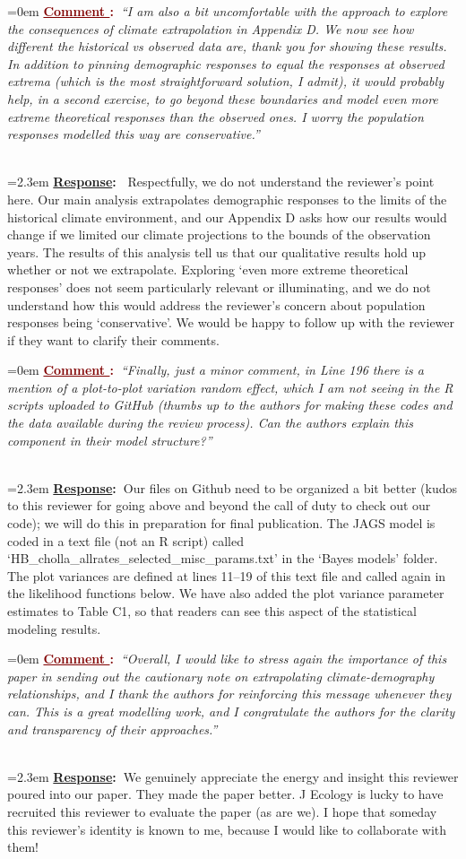 \documentclass[12pt]{article}
\newcounter{cN}
\newcommand{\comment}[1]{
	\vspace{2em}
	\refstepcounter{cN} %
	\noindent \hangindent=0em \textbf{\textcolor{Maroon}{\uline{Comment \thecN}:~}}\emph{``#1''}
	}
\newcommand{\response}[1]{
	\\[0.25em]
	\hangindent=2.3em \textbf{\textcolor{NavyBlue}{\uline{Response}:~}}#1
	}
\begin{document}
\comment{I am also a bit uncomfortable with the approach to explore the consequences of climate extrapolation in Appendix D. We now see how different the historical vs observed data are, thank you for showing these results. In addition to pinning demographic responses to equal the responses at observed extrema (which is the most straightforward solution, I admit), it would probably help, in a second exercise, to go beyond these boundaries and model even more extreme theoretical responses than the observed ones. I worry the population responses modelled this way are conservative.}
\response{
Respectfully, we do not understand the reviewer's point here. 
Our main analysis extrapolates demographic responses to the limits of the historical climate environment, and our Appendix D asks how our results would change if we limited our climate projections to the bounds of the observation years. 
The results of this analysis tell us that our qualitative results hold up whether or not we extrapolate.
Exploring `even more extreme theoretical responses' does not seem particularly relevant or illuminating, and we do not understand how this would address the reviewer's concern about population responses being `conservative'. 
We would be happy to follow up with the reviewer if they want to clarify their comments.
}

\comment{Finally, just a minor comment, in Line 196 there is a mention of a plot-to-plot variation random effect, which I am not seeing in the R scripts uploaded to GitHub (thumbs up to the authors for making these codes and the data available during the review process). Can the authors explain this component in their model structure?}
\response{Our files on Github need to be organized a bit better (kudos to this reviewer for going above and beyond the call of duty to check out our code); we will do this in preparation for final publication. 
The JAGS model is coded in a text file (not an R script) called `HB\_cholla\_allrates\_selected\_misc\_params.txt' in the `Bayes models' folder.
The plot variances are defined at lines 11--19 of this text file and called again in the likelihood functions below.
We have also added the plot variance parameter estimates to Table C1, so that readers can see this aspect of the statistical modeling results.}


\comment{Overall, I would like to stress again the importance of this paper in sending out the cautionary note on extrapolating climate-demography relationships, and I thank the authors for reinforcing this message whenever they can. 
This is a great modelling work, and I congratulate the authors for the clarity and transparency of their approaches.}
\response{We genuinely appreciate the energy and insight this reviewer poured into our paper.
They made the paper better. 
J Ecology is lucky to have recruited this reviewer to evaluate the paper (as are we). 
I hope that someday this reviewer's identity is known to me, because I would like to collaborate with them!}

\end{document}
